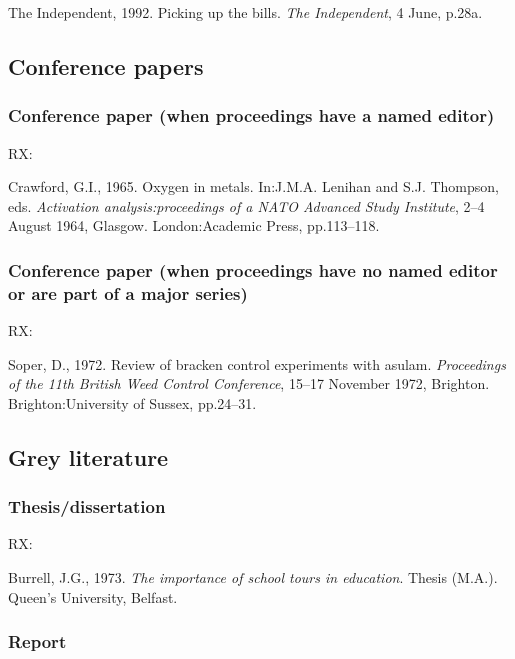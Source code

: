 The Independent, 1992. Picking up the bills. \emph{The Independent}, 4 June, p.28a.



\subsection{Conference papers}

\subsubsection*{Conference paper (when proceedings have a named editor)}

RX: \cite{crawford1965oim}

Crawford, G.I., 1965. Oxygen in metals. In:\@ J.M.A. Lenihan and S.J. Thompson, eds. \emph{Activation analysis:\@ proceedings of a NATO Advanced Study Institute}, 2--4 August 1964, Glasgow. London:\@ Academic Press, pp.113--118.



\subsubsection*{Conference paper (when proceedings have no named editor or are part of a major series)}

RX: \cite{soper1972rbc}

Soper, D., 1972. Review of bracken control experiments with asulam. \emph{Proceedings of the 11th British Weed Control Conference}, 15--17 November 1972, Brighton. Brighton:\@ University of Sussex, pp.24--31.



\subsection{Grey literature}

\subsubsection*{Thesis/dissertation}

RX: \cite{burrell1973ist}

Burrell, J.G., 1973. \emph{The importance of school tours in education}. Thesis (M.A.). Queen's University, Belfast.



\subsubsection*{Report}

